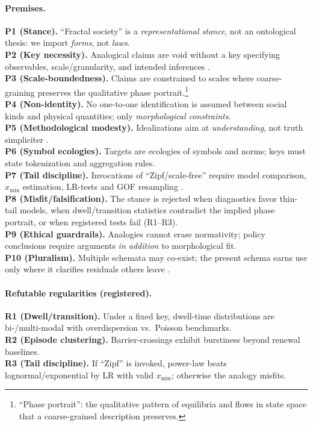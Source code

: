\documentclass[sn-basic,referee,pdflatex]{sn-jnl}
\begin{document}
\paragraph{Premises.}
\textbf{P1 (Stance).} “Fractal society” is a \emph{representational stance}, not an ontological thesis: we import \emph{forms}, not \emph{laws}.\\
\textbf{P2 (Key necessity).} Analogical claims are void without a key specifying observables, scale/granularity, and intended inferences \citep{Suarez2004,FriggNguyen2016}.\\
\textbf{P3 (Scale-boundedness).} Claims are constrained to scales where coarse-graining preserves the qualitative phase portrait.\footnote{“Phase portrait”: the qualitative pattern of equilibria and flows in state space that a coarse-grained description preserves.}\\
\textbf{P4 (Non-identity).} No one-to-one identification is assumed between social kinds and physical quantities; only \emph{morphological constraints}.\\
\textbf{P5 (Methodological modesty).} Idealizations aim at \emph{understanding}, not truth simpliciter \citep{Potochnik2017}.\\
\textbf{P6 (Symbol ecologies).} Targets are ecologies of symbols and norms; keys must state tokenization and aggregation rules.\\
\textbf{P7 (Tail discipline).} Invocations of “Zipf/scale-free” require model comparison, \(x_{\min}\) estimation, LR-tests and GOF resampling \citep{ClausetShaliziNewman2009,Newman2005}.\\
\textbf{P8 (Misfit/falsification).} The stance is rejected when diagnostics favor thin-tail models, when dwell/transition statistics contradict the implied phase portrait, or when registered tests fail (R1--R3).\\
\textbf{P9 (Ethical guardrails).} Analogies cannot erase normativity; policy conclusions require arguments \emph{in addition} to morphological fit.\\
\textbf{P10 (Pluralism).} Multiple schemata may co-exist; the present schema earns use only where it clarifies residuals others leave \citep{LadymanRoss2007,Wimsatt2007,Batterman2002}.

\paragraph{Refutable regularities (registered).}
\textbf{R1 (Dwell/transition).} Under a fixed key, dwell-time distributions are bi-/multi-modal with overdispersion vs.\ Poisson benchmarks.\\
\textbf{R2 (Episode clustering).} Barrier-crossings exhibit burstiness beyond renewal baselines.\\
\textbf{R3 (Tail discipline).} If “Zipf” is invoked, power-law beats lognormal/exponential by LR with valid \(x_{\min}\); otherwise the analogy misfits.
\end{document}
